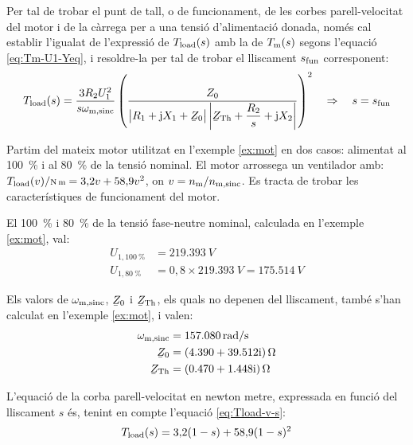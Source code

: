 Per tal de trobar el punt de tall, o de funcionament, de les corbes parell-velocitat del motor i de la càrrega per a una tensió d'alimentació donada, només cal establir l'igualat de l'expressió de $T_\mathrm{load}(s)$ amb la de $T_\mathrm{m}(s)$ segons l'equació \eqref{eq:Tm-U1-Yeq}, i resoldre-la per tal de trobar el lliscament $s_\mathrm{fun}$ corresponent:
\begin{equation}\label{eq:Tload-U1-Yeq}
	T\ped{load}(s) = \frac{3 R_2 U_1^2}{s\omega\ped{m,sinc}}  \left( \frac{Z_0}{\big|R_1 + \ju X_1 + \cmplx{Z}_0\big| \left|\cmplx{Z}\ped{Th} + \dfrac{R_2}{s} + \ju X_2\right|} \right)^2 \quad\Rightarrow \quad s=s\ped{fun}
\end{equation}

\begin{exemple}\label{ex:mot-tens-redu}
	Partim del mateix motor utilitzat en l'exemple \vref{ex:mot} en dos casos: alimentat al \qty{100}{\%} i al \qty{80}{\%} de la tensió nominal. El motor arrossega un ventilador amb: $T\ped{load}(v) /{\scriptstyle \unit{N.m}} = 3{,}2 v + 58{,}9 v^2$, on $v = n_\mathrm{m}/n_\mathrm{m,sinc}$. Es tracta de trobar les característiques de funcionament del motor.
	
	El \qty{100}{\%} i \qty{80}{\%} de la tensió fase-neutre nominal, calculada  en l'exemple \ref{ex:mot}, val:
	\begin{align*}
		U_{1,\qty{100}{\%}} &= \qty{219,393}{V} \\
		U_{1,\qty{80}{\%}} &= 0{,}8\times\qty{219,393}{V} = \qty{175,514}{V}
	\end{align*}

	Els valors de $\omega_\mathrm{m,sinc}$, $\cmplx{Z}_0$ i  $\cmplx{Z}\ped{Th}$, els quals no depenen del lliscament, també s'han calculat en  l'exemple \ref{ex:mot}, i valen:
	\vspace{-2mm}
	\begin{align*}
		\omega\ped{m,sinc} &=  \qty{157,080}{rad/s} \\
		\cmplx{Z}_0 &=  \complexqty{4,390+j39,512}{\ohm} \\
		\cmplx{Z}\ped{Th} &= \complexqty{0,470+j1,448}{\ohm} 
	\end{align*}
	
	L'equació de la corba parell-velocitat en newton metre, expressada en funció del lliscament $s$ és, tenint en compte l'equació \eqref{eq:Tload-v-s}:
	\[
		T_\mathrm{load}(s) = 3{,}2 (1-s) + 58{,}9 (1-s)^2
	\]


\end{exemple}
